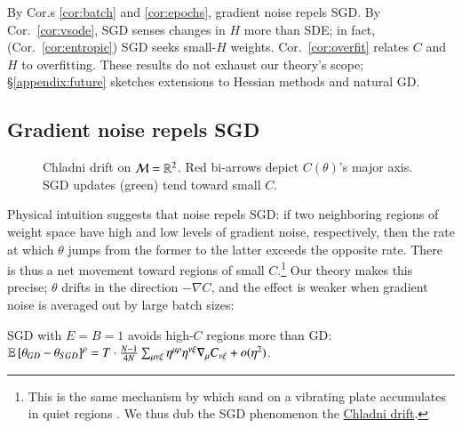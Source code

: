 
        By Cor.s \ref{cor:batch} and \ref{cor:epochs}, gradient noise repels SGD.
        By Cor.\ \ref{cor:vsode}, SGD senses changes in $H$ more than
            SDE; in fact, (Cor.\ \ref{cor:entropic}) SGD seeks small-$H$
            weights.
        Cor.\ \ref{cor:overfit} relates
            $C$ and $H$ to overfitting.  These
            results do not exhaust our theory's scope;
            \S\ref{appendix:future} sketches 
            extensions to Hessian methods and natural GD.

        \subsection{Gradient noise repels SGD}\label{subsect:epochs-batch}
            \begin{wrapfigure}{r}{3.3cm}
                \vspace{-0.60cm}
                \vspace{-0.20cm}
                \caption{
                    Chladni drift on $\mathcal{M}=\mathbb{R}^2$.  Red bi-arrows depict
                    $C(\theta)$'s major axis.  SGD updates (green) tend toward
                    small $C$.
                }
                \vspace{-1.00cm}
            \end{wrapfigure}
            Physical intuition suggests that noise repels SGD: if two
            neighboring regions of weight space have high and low levels of
            gradient noise, respectively, then
            the rate at which
            $\theta$ jumps from the former to the latter
            exceeds%
            the opposite rate.
            There is thus a net movement toward regions of small $C$.\footnote{
                This is the same mechanism by which sand on a vibrating
                plate accumulates in quiet regions \citep{ch87}.  We thus dub
                the SGD phenomenon the
                \href{http://dataphys.org/list/chladni-plates/}{Chladni
                drift}.
            }
            Our theory makes this precise; $\theta$ drifts in the direction
            $-\nabla C$, and the effect is weaker when gradient noise is
            averaged out by large batch sizes:
            \begin{cor} \label{cor:batch}
                SGD with $E=B=1$ avoids high-$C$ regions more than GD:
                $
                    \mathbb{E}\left[\theta_{GD} - \theta_{SGD}\right]^\rho
                        =
                    T \cdot \frac{N-1}{4 N}
                    \sum_{\mu\nu\xi} \eta^{\mu\rho} \eta^{\nu\xi} \nabla_\mu C_{\nu\xi} + o(\eta^2)
                $.
            \end{cor}
